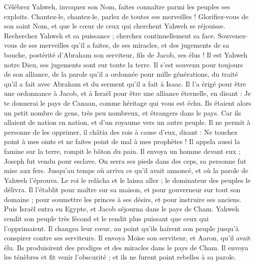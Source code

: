 \begin{multicols}{2}
\VerseOne{}Célébrez Yahweh, invoquez son Nom, faites connaître parmi les peuples ses exploits.
Chantez-le, chantez-le, parlez de toutes ses merveilles !
Glorifiez-vous de son saint Nom, et que le cœur de ceux qui cherchent Yahweh se réjouisse.
Recherchez Yahweh et sa puissance ; cherchez continuellement sa face.
Souvenez-vous de ses merveilles qu'il a faites, de ses miracles, et des jugements de sa bouche,
postérité d'Abraham son serviteur, fils de Jacob, ses élus !
Il est Yahweh notre Dieu, ses jugements sont sur toute la terre.
Il s'est souvenu pour toujours de son alliance, de la parole qu'il a ordonnée pour mille générations,
du traité qu'il a fait avec Abraham et du serment qu'il a fait à Isaac.
Il l’a érigé pour être une ordonnance à Jacob, et à Israël pour être une alliance éternelle,
en disant : Je te donnerai le pays de Canaan, comme héritage qui vous est échu.
Ils étaient alors un petit nombre de gens, très peu nombreux, et étrangers dans le pays.
Car ils allaient de nation en nation, et d'un royaume vers un autre peuple.
Il ne permit à personne de les opprimer, il châtia des rois à cause d'eux,
disant : Ne touchez point à mes oints et ne faites point de mal à mes prophètes !
Il appela aussi la famine sur la terre, rompit le bâton du pain.
Il envoya un homme devant eux ; Joseph fut vendu pour esclave.
On serra ses pieds dans des ceps, sa personne fut mise aux fers.
Jusqu’au temps où arriva ce qu’il avait annoncé, et où la parole de Yahweh l’éprouva.
Le roi le relâcha et le laissa aller ; le dominateur des peuples le délivra.
Il l'établit pour maître sur sa maison, et pour gouverneur sur tout son domaine ;
pour soumettre les princes à ses désirs, et pour instruire ses anciens.
Puis Israël entra en Egypte, et Jacob séjourna dans le pays de Cham.
Yahweh rendit son peuple très fécond et le rendit plus puissant que ceux qui l'opprimaient.
Il changea leur cœur, au point qu'ils haïrent son peuple jusqu’à conspirer contre ses serviteurs.
Il envoya Moïse son serviteur, et Aaron, qu'il avait élu.
Ils produisirent des prodiges et des miracles dans le pays de Cham.
Il envoya les ténèbres et fit venir l’obscurité ; et ils ne furent point rebelles à sa parole.

\end{multicols}
